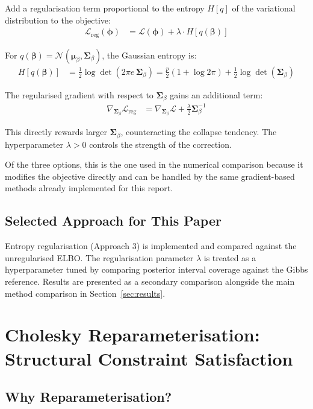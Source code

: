 \documentclass[11pt,a4paper]{article}
\begin{document}
Add a regularisation term proportional to the entropy $H[q]$ of the variational distribution to the objective:
\begin{align}
  \mathcal{L}_{\text{reg}}(\bm{\phi}) &= \mathcal{L}(\bm{\phi}) + \lambda \cdot H[q(\bm{\beta})]
\end{align}

For $q(\bm{\beta}) = \mathcal{N}(\bm{\mu}_\beta, \bm{\Sigma}_\beta)$, the Gaussian entropy is:
\begin{align}
  H[q(\bm{\beta})] &= \frac{1}{2} \log \det(2\pi e\, \bm{\Sigma}_\beta)
               = \frac{p}{2}(1 + \log 2\pi) + \frac{1}{2}\log\det(\bm{\Sigma}_\beta)
\end{align}

The regularised gradient with respect to $\bm{\Sigma}_\beta$ gains an additional term:
\begin{align}
  \nabla_{\bm{\Sigma}_\beta} \mathcal{L}_{\text{reg}} &= \nabla_{\bm{\Sigma}_\beta} \mathcal{L} + \frac{\lambda}{2} \bm{\Sigma}_\beta^{-1}
\end{align}

This directly rewards larger $\bm{\Sigma}_\beta$, counteracting the collapse tendency. The hyperparameter $\lambda > 0$ controls the strength of the correction.

Of the three options, this is the one used in the numerical comparison because it modifies the objective directly and can be handled by the same gradient-based methods already implemented for this report.

\subsection*{Selected Approach for This Paper}

Entropy regularisation (Approach 3) is implemented and compared against the unregularised ELBO. The regularisation parameter $\lambda$ is treated as a hyperparameter tuned by comparing posterior interval coverage against the Gibbs reference. Results are presented as a secondary comparison alongside the main method comparison in Section~\ref{sec:results}.



\section{Cholesky Reparameterisation: Structural Constraint Satisfaction}\label{app:cholesky}

\subsection*{Why Reparameterisation?}
\end{document}
